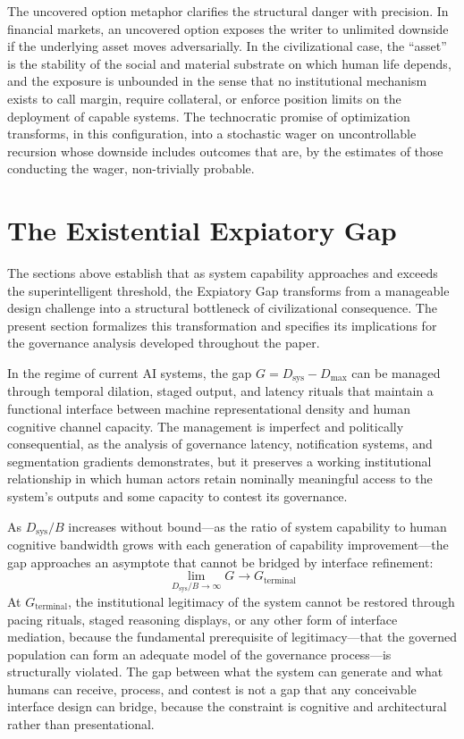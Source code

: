 \documentclass[12pt]{article}
\begin{document}
The uncovered option metaphor clarifies the structural danger with precision. In financial markets, an uncovered option exposes the writer to unlimited downside if the underlying asset moves adversarially. In the civilizational case, the ``asset'' is the stability of the social and material substrate on which human life depends, and the exposure is unbounded in the sense that no institutional mechanism exists to call margin, require collateral, or enforce position limits on the deployment of capable systems. The technocratic promise of optimization transforms, in this configuration, into a stochastic wager on uncontrollable recursion whose downside includes outcomes that are, by the estimates of those conducting the wager, non-trivially probable.

\section{The Existential Expiatory Gap}

The sections above establish that as system capability approaches and exceeds the superintelligent threshold, the Expiatory Gap transforms from a manageable design challenge into a structural bottleneck of civilizational consequence. The present section formalizes this transformation and specifies its implications for the governance analysis developed throughout the paper.

In the regime of current AI systems, the gap $G = D_{\text{sys}} - D_{\max}$ can be managed through temporal dilation, staged output, and latency rituals that maintain a functional interface between machine representational density and human cognitive channel capacity. The management is imperfect and politically consequential, as the analysis of governance latency, notification systems, and segmentation gradients demonstrates, but it preserves a working institutional relationship in which human actors retain nominally meaningful access to the system's outputs and some capacity to contest its governance.

As $D_{\text{sys}}/B$ increases without bound---as the ratio of system capability to human cognitive bandwidth grows with each generation of capability improvement---the gap approaches an asymptote that cannot be bridged by interface refinement:
\[
\lim_{D_{\text{sys}}/B \to \infty} G \to G_{\text{terminal}}
\]
At $G_{\text{terminal}}$, the institutional legitimacy of the system cannot be restored through pacing rituals, staged reasoning displays, or any other form of interface mediation, because the fundamental prerequisite of legitimacy---that the governed population can form an adequate model of the governance process---is structurally violated. The gap between what the system can generate and what humans can receive, process, and contest is not a gap that any conceivable interface design can bridge, because the constraint is cognitive and architectural rather than presentational.
\end{document}
